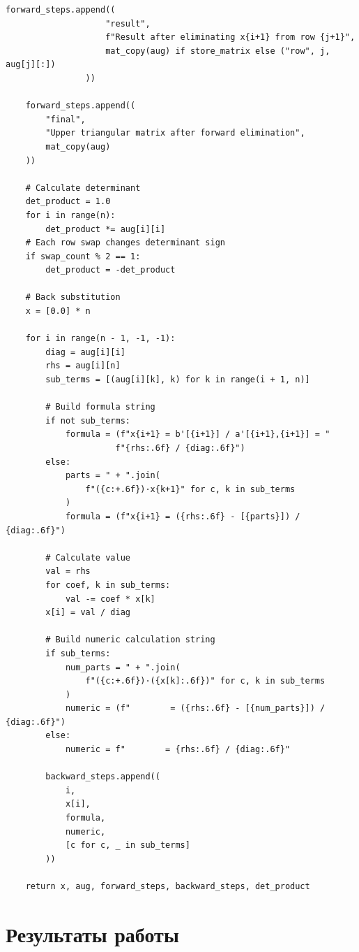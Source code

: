 \documentclass[a4paper,12pt]{article}
\begin{document}
\begin{lstlisting}[style=intellij,caption={Код основной функции на Python}]
                forward_steps.append((
                    "result",
                    f"Result after eliminating x{i+1} from row {j+1}",
                    mat_copy(aug) if store_matrix else ("row", j, aug[j][:])
                ))

    forward_steps.append((
        "final",
        "Upper triangular matrix after forward elimination",
        mat_copy(aug)
    ))

    # Calculate determinant
    det_product = 1.0
    for i in range(n):
        det_product *= aug[i][i]
    # Each row swap changes determinant sign
    if swap_count % 2 == 1:
        det_product = -det_product

    # Back substitution
    x = [0.0] * n

    for i in range(n - 1, -1, -1):
        diag = aug[i][i]
        rhs = aug[i][n]
        sub_terms = [(aug[i][k], k) for k in range(i + 1, n)]

        # Build formula string
        if not sub_terms:
            formula = (f"x{i+1} = b'[{i+1}] / a'[{i+1},{i+1}] = "
                      f"{rhs:.6f} / {diag:.6f}")
        else:
            parts = " + ".join(
                f"({c:+.6f})·x{k+1}" for c, k in sub_terms
            )
            formula = (f"x{i+1} = ({rhs:.6f} - [{parts}]) / {diag:.6f}")

        # Calculate value
        val = rhs
        for coef, k in sub_terms:
            val -= coef * x[k]
        x[i] = val / diag

        # Build numeric calculation string
        if sub_terms:
            num_parts = " + ".join(
                f"({c:+.6f})·({x[k]:.6f})" for c, k in sub_terms
            )
            numeric = (f"        = ({rhs:.6f} - [{num_parts}]) / {diag:.6f}")
        else:
            numeric = f"        = {rhs:.6f} / {diag:.6f}"

        backward_steps.append((
            i,
            x[i],
            formula,
            numeric,
            [c for c, _ in sub_terms]
        ))

    return x, aug, forward_steps, backward_steps, det_product
\end{lstlisting}


\newpage

\section{Результаты работы}
\end{document}
